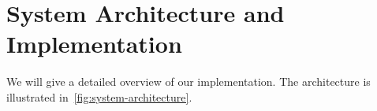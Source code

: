
\chapter{System Architecture and Implementation}\label{chap:implementation}

%
%

We will give a detailed overview of our implementation.
The architecture is illustrated in~\cref{fig:system-architecture}.





